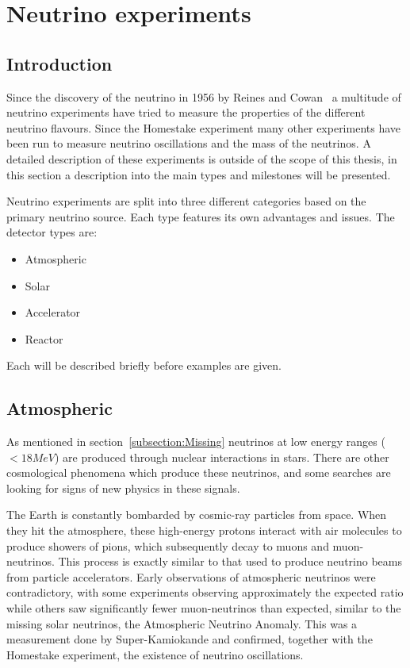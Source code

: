 \chapter{Neutrino  experiments}
\label{c:expIntro}

\section{Introduction}
Since the discovery of the neutrino in 1956 by Reines and Cowan~\cite{6Reines} a multitude of neutrino experiments have tried to measure the properties of the different neutrino flavours. Since the Homestake experiment many other experiments have been run to measure neutrino oscillations and the mass of the neutrinos. A detailed description of these experiments is outside of the scope of this thesis, in this section a description into the main types and milestones will be presented.

Neutrino experiments are split into three different categories based on the primary neutrino source. Each type features its own advantages and issues.
The detector types are:
\begin{itemize}
\item Atmospheric
\item Solar
\item Accelerator
\item Reactor
\end{itemize}
Each will be described briefly before examples are given.

\section{Atmospheric}

As mentioned in section~\ref{subsection:Missing} neutrinos at low energy ranges ($<18 MeV$) are produced through nuclear interactions in stars. There are other cosmological phenomena which produce these neutrinos, and some searches are looking for signs of new physics in these signals. 

The Earth is constantly bombarded by cosmic-ray particles from space. When they hit the atmosphere, these high-energy protons interact with air molecules to produce showers of pions, which subsequently decay to muons and muon-neutrinos. This process is exactly similar to that used to produce neutrino beams from particle accelerators. Early observations of atmospheric neutrinos were contradictory, with some experiments observing approximately the expected ratio while others saw significantly fewer muon-neutrinos than expected, similar to the missing solar neutrinos, the Atmospheric Neutrino Anomaly. This was a measurement done by Super-Kamiokande and confirmed, together with the Homestake experiment, the existence of neutrino oscillations.

